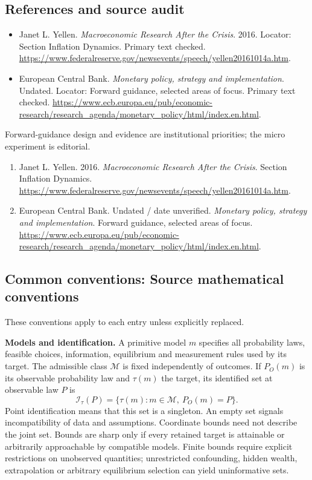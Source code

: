 \documentclass[11pt,a4paper]{article}
\begin{document}
\subsection*{References and source audit}
\begin{itemize}
\item Janet L. Yellen. \emph{Macroeconomic Research After the Crisis}. 2016. Locator: Section Inflation Dynamics. Primary text checked. \url{https://www.federalreserve.gov/newsevents/speech/yellen20161014a.htm}.
\item European Central Bank. \emph{Monetary policy, strategy and implementation}. Undated. Locator: Forward guidance, selected areas of focus. Primary text checked. \url{https://www.ecb.europa.eu/pub/economic-research/research_agenda/monetary_policy/html/index.en.html}.
\end{itemize}
Forward-guidance design and evidence are institutional priorities; the micro experiment is editorial.
\begin{enumerate}\raggedright
\item\hypertarget{definitions:source:30007531:1}{} Janet L. Yellen. 2016. \emph{Macroeconomic Research After the Crisis}. Section Inflation Dynamics.
\url{https://www.federalreserve.gov/newsevents/speech/yellen20161014a.htm}.
\item\hypertarget{definitions:source:30007531:2}{} European Central Bank. Undated / date unverified. \emph{Monetary policy, strategy and implementation}. Forward guidance, selected areas of focus.
\url{https://www.ecb.europa.eu/pub/economic-research/research_agenda/monetary_policy/html/index.en.html}.
\end{enumerate}

\subsection*{Common conventions: Source mathematical conventions}

These conventions apply to each entry unless explicitly replaced.

\textbf{Models and identification.} A primitive model \(m\) specifies all probability laws, feasible choices, information, equilibrium and measurement rules used by its target. The admissible class \(\mathcal M\) is fixed independently of outcomes. If \(P_O(m)\) is its observable probability law and \(\tau(m)\) the target, its identified set at observable law \(P\) is
\[
 \mathcal I_\tau(P)=\{\tau(m):m\in\mathcal M,\ P_O(m)=P\}.
\]
Point identification means that this set is a singleton. An empty set signals incompatibility of data and assumptions. Coordinate bounds need not describe the joint set. Bounds are sharp only if every retained target is attainable or arbitrarily approachable by compatible models. Finite bounds require explicit restrictions on unobserved quantities; unrestricted confounding, hidden wealth, extrapolation or arbitrary equilibrium selection can yield uninformative sets.
\end{document}
